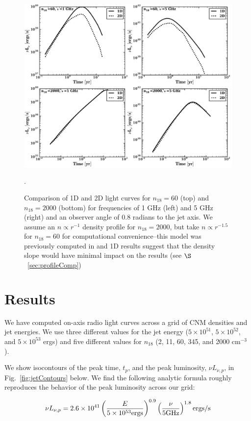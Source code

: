 \documentclass[usenatbib,fleqn]{mnras}
\begin{document}
\begin{figure}
\includegraphics[width=16cm]{1D_2D.pdf}
\caption{\label{fig:1D2DB} Comparison of 1D and 2D light curves for
  $n_{18}=60$ (top) and $n_{18}=2000$ (bottom) for frequencies of 1
  GHz (left) and 5 GHz (right) and an observer angle of 0.8 radians
  to the jet axis. We assume an $n\propto r^{-1}$ density profile for
  $n_{18}=2000$, but take $n\propto r^{-1.5}$ for $n_{18}=60$ for
  computational convenience--this model was previously computed in
  \citet{Mimica+2015} and 1D results suggest that the density slope would
  have minimal impact on the results (see $\S$~\ref{sec:profileComp})}.
\end{figure}

\section{Results}
\label{sec:results}
We have computed on-axis radio light curves across a grid of CNM
densities and jet energies. We use three different values for the
jet energy ($5 \times 10^{51}$, $5 \times 10^{52}$, and $5 \times
10^{53}$ ergs) and five different values for $n_{18}$ (2, 11, 60, 345,
and 2000 cm$^{-3}$). 

We show isocontours of the peak time, $t_p$, and the peak luminosity,
$\nu L_{\nu, p}$, in Fig.~\ref{fig:jetContours} below. We find the
following analytic formula roughly reproduces the behavior of the peak
luminosity across our grid:

\begin{equation}
\nu L_{\nu, p}=2.6 \times 10^{41} \left(\frac{E}{5 \times 10^{53}
    {\rm ergs}}\right)^{0.9}
\left(\frac{\nu}{5 {\rm GHz}}\right)^{1.8} {\rm ergs/s}
\label{eq:peakLum}
\end{equation}
\end{document}
